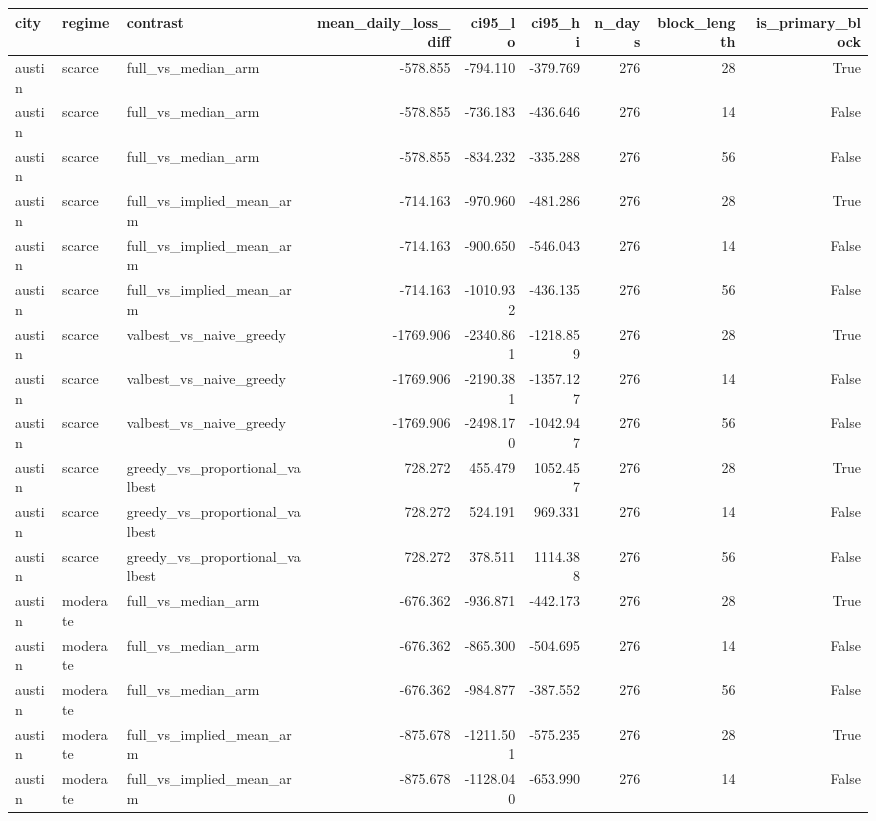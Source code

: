 \begin{tabular}{lllrrrrrr}
\toprule
city & regime & contrast & mean\_daily\_loss\_diff & ci95\_lo & ci95\_hi & n\_days & block\_length & is\_primary\_block \\
\midrule
austin & scarce & full\_vs\_median\_arm & -578.855 & -794.110 & -379.769 & 276 & 28 & True \\
austin & scarce & full\_vs\_median\_arm & -578.855 & -736.183 & -436.646 & 276 & 14 & False \\
austin & scarce & full\_vs\_median\_arm & -578.855 & -834.232 & -335.288 & 276 & 56 & False \\
austin & scarce & full\_vs\_implied\_mean\_arm & -714.163 & -970.960 & -481.286 & 276 & 28 & True \\
austin & scarce & full\_vs\_implied\_mean\_arm & -714.163 & -900.650 & -546.043 & 276 & 14 & False \\
austin & scarce & full\_vs\_implied\_mean\_arm & -714.163 & -1010.932 & -436.135 & 276 & 56 & False \\
austin & scarce & valbest\_vs\_naive\_greedy & -1769.906 & -2340.861 & -1218.859 & 276 & 28 & True \\
austin & scarce & valbest\_vs\_naive\_greedy & -1769.906 & -2190.381 & -1357.127 & 276 & 14 & False \\
austin & scarce & valbest\_vs\_naive\_greedy & -1769.906 & -2498.170 & -1042.947 & 276 & 56 & False \\
austin & scarce & greedy\_vs\_proportional\_valbest & 728.272 & 455.479 & 1052.457 & 276 & 28 & True \\
austin & scarce & greedy\_vs\_proportional\_valbest & 728.272 & 524.191 & 969.331 & 276 & 14 & False \\
austin & scarce & greedy\_vs\_proportional\_valbest & 728.272 & 378.511 & 1114.388 & 276 & 56 & False \\
austin & moderate & full\_vs\_median\_arm & -676.362 & -936.871 & -442.173 & 276 & 28 & True \\
austin & moderate & full\_vs\_median\_arm & -676.362 & -865.300 & -504.695 & 276 & 14 & False \\
austin & moderate & full\_vs\_median\_arm & -676.362 & -984.877 & -387.552 & 276 & 56 & False \\
austin & moderate & full\_vs\_implied\_mean\_arm & -875.678 & -1211.501 & -575.235 & 276 & 28 & True \\
austin & moderate & full\_vs\_implied\_mean\_arm & -875.678 & -1128.040 & -653.990 & 276 & 14 & False \\

\end{tabular}
